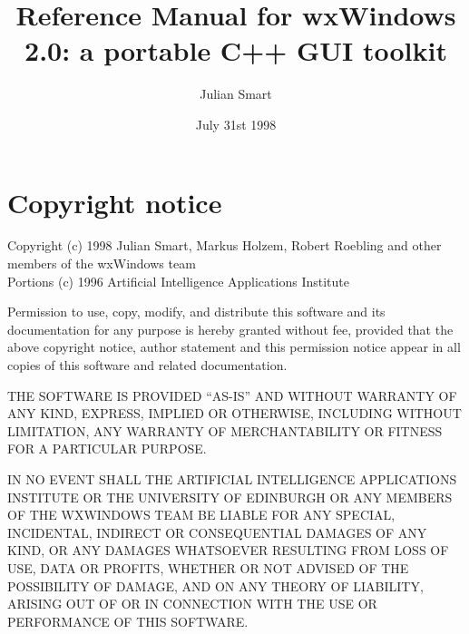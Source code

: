 \addtolength{\textwidth}{1in}
\addtolength{\oddsidemargin}{-0.5in}
\addtolength{\topmargin}{-0.5in}
\addtolength{\textheight}{1in}
\sloppy
\newcommand{\indexit}[1]{#1\index{#1}}
\newcommand{\pipe}[0]{$\|$\ }%



\parskip=10pt
\parindent=0pt
\title{Reference Manual for wxWindows 2.0: a portable C++ GUI toolkit}
\author{Julian Smart}
\date{July 31st 1998}

\makeindex

\maketitle

\pagestyle{fancyplain}

\setfooter{\thepage}{}{}{}{}{\thepage}
\tableofcontents


\chapter*{Copyright notice}
%
\setfooter{\thepage}{}{}{}{}{\thepage}

\begin{center}
Copyright (c) 1998 Julian Smart, Markus Holzem, Robert Roebling and other
members of the wxWindows team\\
Portions (c) 1996 Artificial Intelligence Applications Institute\\
\end{center}

Permission to use, copy, modify, and distribute this software and its
documentation for any purpose is hereby granted without fee, provided that the
above copyright notice, author statement and this permission notice appear in
all copies of this software and related documentation.

THE SOFTWARE IS PROVIDED ``AS-IS'' AND WITHOUT WARRANTY OF ANY KIND, EXPRESS,
IMPLIED OR OTHERWISE, INCLUDING WITHOUT LIMITATION, ANY WARRANTY OF
MERCHANTABILITY OR FITNESS FOR A PARTICULAR PURPOSE.

IN NO EVENT SHALL THE ARTIFICIAL INTELLIGENCE APPLICATIONS INSTITUTE OR THE
UNIVERSITY OF EDINBURGH OR ANY MEMBERS OF THE WXWINDOWS TEAM BE LIABLE FOR ANY SPECIAL, INCIDENTAL, INDIRECT OR
CONSEQUENTIAL DAMAGES OF ANY KIND, OR ANY DAMAGES WHATSOEVER RESULTING FROM
LOSS OF USE, DATA OR PROFITS, WHETHER OR NOT ADVISED OF THE POSSIBILITY OF
DAMAGE, AND ON ANY THEORY OF LIABILITY, ARISING OUT OF OR IN CONNECTION WITH
THE USE OR PERFORMANCE OF THIS SOFTWARE.

